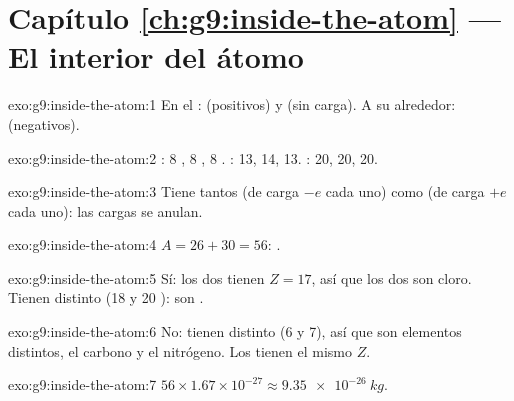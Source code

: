 \section*{Capítulo \ref{ch:g9:inside-the-atom} --- El interior del átomo}

\begin{solution}{exo:g9:inside-the-atom:1}
En el :  (positivos) y  (sin carga). A su
alrededor:  (negativos).
\end{solution}

\begin{solution}{exo:g9:inside-the-atom:2}
: 8 , 8 , 8 .
: 13, 14, 13. : 20, 20, 20.
\end{solution}

\begin{solution}{exo:g9:inside-the-atom:3}
Tiene tantos  (de carga $-e$ cada uno) como  (de carga
$+e$ cada uno): las cargas se anulan.
\end{solution}

\begin{solution}{exo:g9:inside-the-atom:4}
$A = 26 + 30 = 56$: .
\end{solution}

\begin{solution}{exo:g9:inside-the-atom:5}
Sí: los dos tienen $Z = 17$, así que los dos son cloro. Tienen distinto
 (18 y 20 ): son .
\end{solution}

\begin{solution}{exo:g9:inside-the-atom:6}
No: tienen distinto  (6 y 7), así que son elementos
distintos, el carbono y el nitrógeno. Los  tienen el mismo $Z$.
\end{solution}

\begin{solution}{exo:g9:inside-the-atom:7}
$56 \times 1.67 \times 10^{-27} \approx \qty{9.35e-26}{kg}$.
\end{solution}

